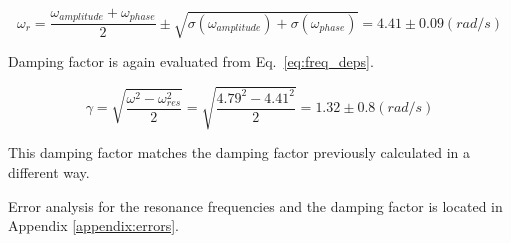 \begin{equation*}
\omega_{r} = \frac{\omega_{amplitude} + \omega_{phase}}{2} \pm \sqrt{\sigma(\omega_{amplitude}) + \sigma(\omega_{phase})} = 4.41 \pm 0.09 (rad/s)
\end{equation*}

Damping factor is again evaluated from Eq.~\ref{eq:freq_deps}.

\begin{equation*}
        \gamma = \sqrt{ \frac{\omega^2 - \omega_{res}^2}{2} } = \sqrt{ \frac{4.79^2 - 4.41^2}{2} } = 1.32 \pm 0.8 (rad/s)
\end{equation*}       

This damping factor matches the damping factor previously calculated in a different way.

Error analysis for the resonance frequencies and the damping factor is located in Appendix \ref{appendix:errors}.
